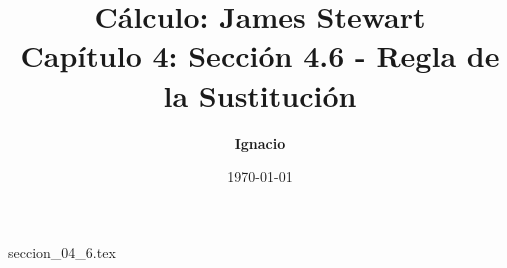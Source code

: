 \documentclass[11pt,spanish,oneside]{report}
\title{\textbf{Cálculo: James Stewart} \\ \Large Capítulo 4: Sección 4.6 - Regla de la Sustitución}
\author{\textbf{Ignacio}}
\date{\today}
\begin{document}
\maketitle

{seccion_04_6.tex}
\end{document}
